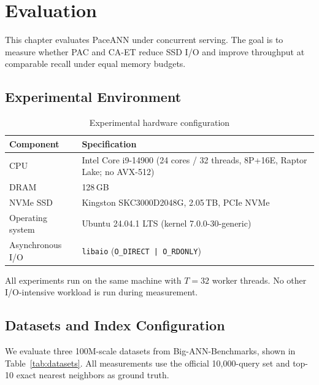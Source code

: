 \chapter{Evaluation}
\label{ch:method}
\label{ch:evaluation}

This chapter evaluates PaceANN under concurrent serving.
The goal is to measure whether PAC and CA-ET reduce SSD I/O and improve throughput at comparable recall under equal memory budgets.

\section{Experimental Environment}
\label{sec:testbed}

\begin{table}[h]
\centering
\caption[Experimental hardware]{Experimental hardware configuration}
\label{tab:hardware}
\begin{tabular}{ll}
\toprule
Component & Specification \\
\midrule
CPU & Intel Core i9-14900 (24 cores / 32 threads, 8P+16E, Raptor Lake; no AVX-512) \\
DRAM & 128\,GB \\
NVMe SSD & Kingston SKC3000D2048G, 2.05\,TB, PCIe NVMe \\
Operating system & Ubuntu 24.04.1 LTS (kernel 7.0.0-30-generic) \\
Asynchronous I/O & \texttt{libaio} (\texttt{O\_DIRECT | O\_RDONLY}) \\
\bottomrule
\end{tabular}
\end{table}

All experiments run on the same machine with $T=32$ worker threads.
No other I/O-intensive workload is run during measurement.

\section{Datasets and Index Configuration}
\label{sec:dataset}

We evaluate three 100M-scale datasets from Big-ANN-Benchmarks, shown in Table~\ref{tab:datasets}.
All measurements use the official 10,000-query set and top-10 exact nearest neighbors as ground truth.

